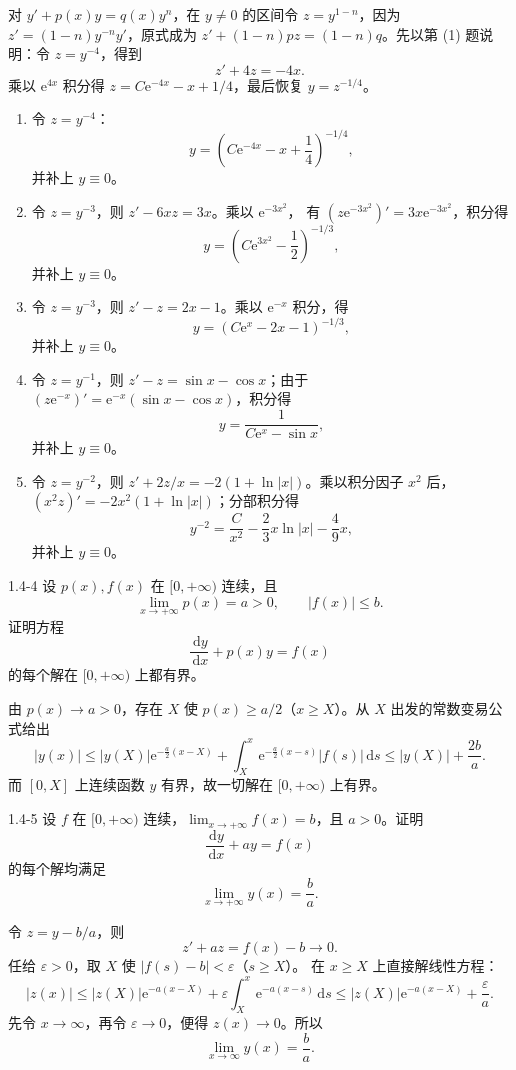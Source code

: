 \documentclass[UTF8,a4paper,11pt]{ctexart}
\newcommand{\dd}{\,\mathrm d}
\newcommand{\e}{\mathrm e}
\begin{document}
\begin{solution}
对 $y'+p(x)y=q(x)y^n$，在 $y\ne0$ 的区间令
$z=y^{1-n}$，因为 $z'=(1-n)y^{-n}y'$，原式成为
$z'+(1-n)pz=(1-n)q$。先以第 (1) 题说明：令 $z=y^{-4}$，得到
\[
z'+4z=-4x.
\]
乘以 $\e^{4x}$ 积分得 $z=C\e^{-4x}-x+1/4$，最后恢复 $y=z^{-1/4}$。
\begin{enumerate}[label=(\arabic*)]
\item 令 $z=y^{-4}$：
\[
\boxed{y=\left(C\e^{-4x}-x+\frac14\right)^{-1/4}},
\]
并补上 $y\equiv0$。
\item 令 $z=y^{-3}$，则 $z'-6xz=3x$。乘以 $\e^{-3x^2}$，
有 $(z\e^{-3x^2})'=3x\e^{-3x^2}$，积分得
\[
\boxed{y=\left(C\e^{3x^2}-\frac12\right)^{-1/3}},
\]
并补上 $y\equiv0$。
\item 令 $z=y^{-3}$，则 $z'-z=2x-1$。乘以 $\e^{-x}$ 积分，得
\[
\boxed{y=(C\e^x-2x-1)^{-1/3}},
\]
并补上 $y\equiv0$。
\item 令 $z=y^{-1}$，则 $z'-z=\sin x-\cos x$；由于
$(z\e^{-x})'=\e^{-x}(\sin x-\cos x)$，积分得
\[
\boxed{y=\frac1{C\e^x-\sin x}},
\]
并补上 $y\equiv0$。
\item 令 $z=y^{-2}$，则
$z'+2z/x=-2(1+\ln|x|)$。乘以积分因子 $x^2$ 后，
$(x^2z)'=-2x^2(1+\ln|x|)$；分部积分得
\[
\boxed{y^{-2}=\frac C{x^2}-\frac23x\ln|x|-\frac49x},
\]
并补上 $y\equiv0$。
\end{enumerate}
\end{solution}

\begin{problem}{1.4-4}
设 $p(x),f(x)$ 在 $[0,+\infty)$ 连续，且
  \[
    \lim_{x\to+\infty}p(x)=a>0,\qquad |f(x)|\le b.
  \]
  证明方程
  \[
    \frac{\dd y}{\dd x}+p(x)y=f(x)
  \]
  的每个解在 $[0,+\infty)$ 上都有界。
\end{problem}

\begin{solution}
由 $p(x)\to a>0$，存在 $X$ 使 $p(x)\ge a/2$（$x\ge X$）。从 $X$ 出发的常数变易公式给出
\[
|y(x)|\le |y(X)|\e^{-\frac a2(x-X)}+
\int_X^x \e^{-\frac a2(x-s)}|f(s)|\dd s
\le |y(X)|+\frac{2b}{a}.
\]
而 $[0,X]$ 上连续函数 $y$ 有界，故一切解在 $[0,+\infty)$ 上有界。
\end{solution}

\begin{problem}{1.4-5}
设 $f$ 在 $[0,+\infty)$ 连续，$\lim_{x\to+\infty}f(x)=b$，且 $a>0$。证明
  \[
    \frac{\dd y}{\dd x}+ay=f(x)
  \]
  的每个解均满足
  \[
    \lim_{x\to+\infty}y(x)=\frac ba.
  \]
\end{problem}

\begin{solution}
令 $z=y-b/a$，则
\[
z'+az=f(x)-b\longrightarrow0.
\]
任给 $\varepsilon>0$，取 $X$ 使 $|f(s)-b|<\varepsilon$（$s\ge X$）。
在 $x\ge X$ 上直接解线性方程：
\[
|z(x)|\le |z(X)|\e^{-a(x-X)}
+\varepsilon\int_X^x\e^{-a(x-s)}\dd s
\le |z(X)|\e^{-a(x-X)}+\frac{\varepsilon}{a}.
\]
先令 $x\to\infty$，再令 $\varepsilon\to0$，便得 $z(x)\to0$。所以
\[
\boxed{\lim_{x\to\infty}y(x)=\frac ba}.
\]
\end{solution}
\end{document}
